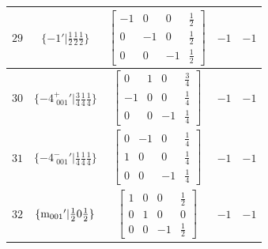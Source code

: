 \documentclass[fleqn,8pt]{jsarticle}
\begin{document}
\begin{longtable}{ccccc}
$ 29 $ & $ \{-1{}'|\frac{1}{2} \frac{1}{2} \frac{1}{2}\} $ & $ \begin{bmatrix} -1 & 0 & 0 & \frac{1}{2} \\ 0 & -1 & 0 & \frac{1}{2} \\ 0 & 0 & -1 & \frac{1}{2} \end{bmatrix} $ & $ -1 $ & $ -1 $ \\ \hline
$ 30 $ & $ \{-4^{+}_{\,\,001}{}'|\frac{3}{4} \frac{1}{4} \frac{1}{4}\} $ & $ \begin{bmatrix} 0 & 1 & 0 & \frac{3}{4} \\ -1 & 0 & 0 & \frac{1}{4} \\ 0 & 0 & -1 & \frac{1}{4} \end{bmatrix} $ & $ -1 $ & $ -1 $ \\ \hline
$ 31 $ & $ \{-4^{-}_{\,\,001}{}'|\frac{1}{4} \frac{1}{4} \frac{1}{4}\} $ & $ \begin{bmatrix} 0 & -1 & 0 & \frac{1}{4} \\ 1 & 0 & 0 & \frac{1}{4} \\ 0 & 0 & -1 & \frac{1}{4} \end{bmatrix} $ & $ -1 $ & $ -1 $ \\ \hline
$ 32 $ & $ \{{\rm m}_{001}{}'|\frac{1}{2} 0 \frac{1}{2}\} $ & $ \begin{bmatrix} 1 & 0 & 0 & \frac{1}{2} \\ 0 & 1 & 0 & 0 \\ 0 & 0 & -1 & \frac{1}{2} \end{bmatrix} $ & $ -1 $ & $ -1 $ \\
\end{longtable}
\end{document}
